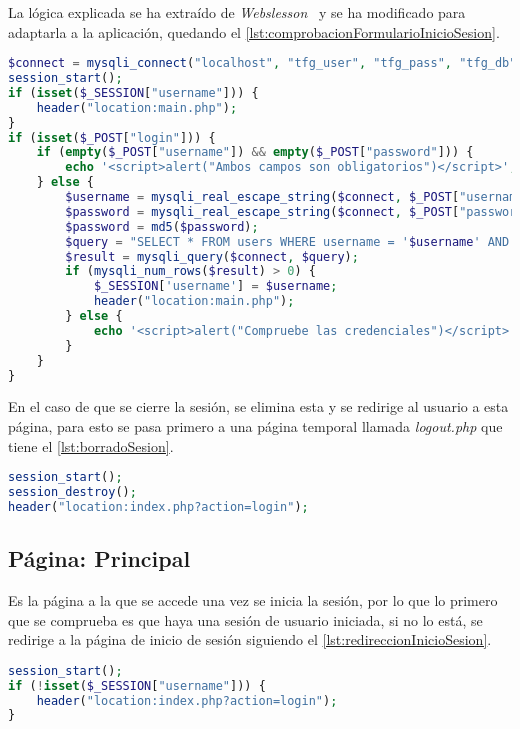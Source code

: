 La lógica explicada se ha extraído de \textit{Webslesson}~\cite{webslesson_php_nodate} y se ha modificado para adaptarla a la aplicación, quedando el \autoref{lst:comprobacionFormularioInicioSesion}.
\begin{lstlisting}[language=PHP, caption=Comprobación formulario Inicio de sesión, label=lst:comprobacionFormularioInicioSesion]
$connect = mysqli_connect("localhost", "tfg_user", "tfg_pass", "tfg_db");
session_start();
if (isset($_SESSION["username"])) {
    header("location:main.php");
}
if (isset($_POST["login"])) {
    if (empty($_POST["username"]) && empty($_POST["password"])) {
        echo '<script>alert("Ambos campos son obligatorios")</script>';
    } else {
        $username = mysqli_real_escape_string($connect, $_POST["username"]);
        $password = mysqli_real_escape_string($connect, $_POST["password"]);
        $password = md5($password);
        $query = "SELECT * FROM users WHERE username = '$username' AND password = '$password'";
        $result = mysqli_query($connect, $query);
        if (mysqli_num_rows($result) > 0) {
            $_SESSION['username'] = $username;
            header("location:main.php");
        } else {
            echo '<script>alert("Compruebe las credenciales")</script>';
        }
    }
}
\end{lstlisting}

En el caso de que se cierre la sesión, se elimina esta y se redirige al usuario a esta página, para esto se pasa primero a una página temporal llamada \textit{logout.php} que tiene el \autoref{lst:borradoSesion}.
\begin{lstlisting}[language=PHP, caption=Borrado de sesión y redirección a la página de inicio, label=lst:borradoSesion]
session_start();
session_destroy();
header("location:index.php?action=login");
\end{lstlisting}

\subsection{Página: Principal}\label{subsec:implPagPrincipal}
Es la página a la que se accede una vez se inicia la sesión, por lo que lo primero que se comprueba es que haya una sesión de usuario iniciada, si no lo está, se redirige a la página de inicio de sesión siguiendo el \autoref{lst:redireccionInicioSesion}.
\begin{lstlisting}[language=PHP, caption=Redirección a la página de inicio de sesión si sesión no iniciada, label=lst:redireccionInicioSesion]
session_start();
if (!isset($_SESSION["username"])) {
    header("location:index.php?action=login");
}
\end{lstlisting}

